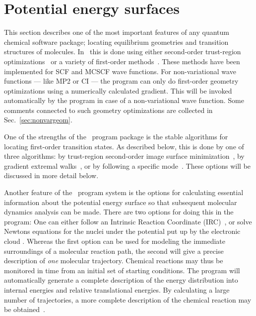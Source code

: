 \chapter{Potential energy surfaces}\label{ch:geometrywalks}

This section describes one of the most important features of any
quantum chemical software package; locating equilibrium
geometries and 
transition structures of molecules. In
\siraba\ this is done using either 
second-order trust-region 
optimizations~\cite{tuhjahjajpjjcp84} or a 
variety of first-order
methods~\cite{Fletcher}. These methods 
have been implemented for SCF and MCSCF wave functions. For
non-variational wave functions --- like MP2 or CI --- the program can
only do first-order geometry optimizations using a
numerically
calculated gradient. This will be invoked automatically by the program
in case of a non-variational wave function. Some comments connected to
such geometry optimizations are collected in Sec.~\ref{sec:nonvargeom}.

One of the strengths of the \siraba\ program package is the
stable algorithms for locating first-order transition
states. As described below, 
this is done by one of three algorithms: by trust-region
second-order image surface minimization~\cite{thcpl182}, by gradient extremal
walks~\cite{pjhjajthtca73}, or by following a
specific mode~\cite{hjajpjthjcp85}. These
options will be discussed in more detail below.  

Another feature of the \siraba\ program system is the options for
calculating essential information about the potential energy surface
so that subsequent molecular dynamics analysis can be made. There are two
options for doing this in the program: One can either follow an
Intrinsic Reaction Coordinate
(IRC)~\cite{pjhjajthtca73}, or 
solve Newtons equations for the nuclei under the potential put up by
the electronic cloud \cite{theuhjajcpl173}. Whereas
the first option can be 
used for modeling the immediate surroundings of a molecular reaction
path, the second will give a precise description of {\em one} molecular
trajectory. 
Chemical reactions may thus be monitored in time from an initial set
of starting conditions.
The program will automatically generate a complete description of the
energy distribution into internal energies and relative translational energies.
By calculating a large number of trajectories, a more
complete description of the chemical reaction may be
obtained~\cite{rsgmtjdwrjbjcp106}. 

